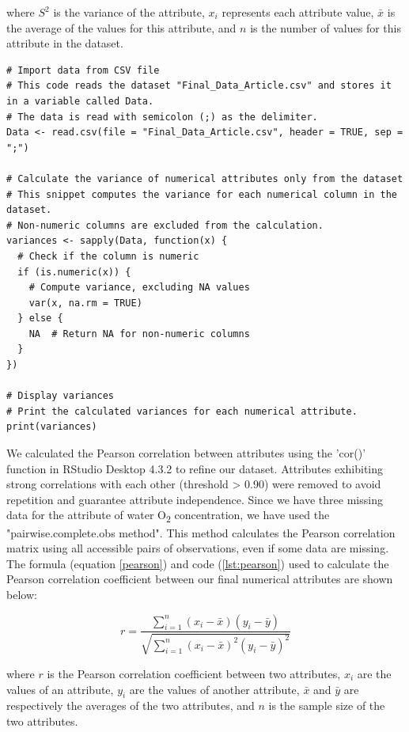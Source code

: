 where $S^2$ is the variance of the attribute, $x_i$ represents each attribute value, $\bar{x}$ is the average of the values for this attribute, and $n$ is the number of values for this attribute in the dataset.

\begin{lstlisting}[label=lst:variance,language=RStudio,caption=RStudio script to calculate the variance of each numerical attributes in our final dataset]
# Import data from CSV file
# This code reads the dataset "Final_Data_Article.csv" and stores it in a variable called Data.
# The data is read with semicolon (;) as the delimiter.
Data <- read.csv(file = "Final_Data_Article.csv", header = TRUE, sep = ";")

# Calculate the variance of numerical attributes only from the dataset
# This snippet computes the variance for each numerical column in the dataset.
# Non-numeric columns are excluded from the calculation.
variances <- sapply(Data, function(x) {
  # Check if the column is numeric
  if (is.numeric(x)) {
    # Compute variance, excluding NA values
    var(x, na.rm = TRUE)
  } else {
    NA  # Return NA for non-numeric columns
  }
})

# Display variances
# Print the calculated variances for each numerical attribute.
print(variances)
\end{lstlisting}

We calculated the Pearson correlation between attributes using the 'cor()' function in RStudio Desktop 4.3.2 to refine our dataset. Attributes exhibiting strong correlations with each other (threshold > 0.90) were removed to avoid repetition and guarantee attribute independence. Since we have three missing data for the attribute of water O\textsubscript{2} concentration, we have used the "pairwise.complete.obs method". This method calculates the Pearson correlation matrix using all accessible pairs of observations, even if some data are missing. The formula (equation \ref{pearson}) and code (\autoref{lst:pearson}) used to calculate the Pearson correlation coefficient between our final numerical attributes are shown below:

\begin{equation}\label{pearson}
    r = \frac{\sum_{i=1}^{n} (x_i - \bar{x})(y_i - \bar{y})}{\sqrt{\sum_{i=1}^{n} (x_i - \bar{x})^2 (y_i - \bar{y})^2}}
\end{equation}

where $r$ is the Pearson correlation coefficient between two attributes, $x_i$ are the values of an attribute, $y_i$ are the values of another attribute, $\bar{x}$ and $\bar{y}$ are respectively the averages of the two attributes, and $n$ is the sample size of the two attributes.

